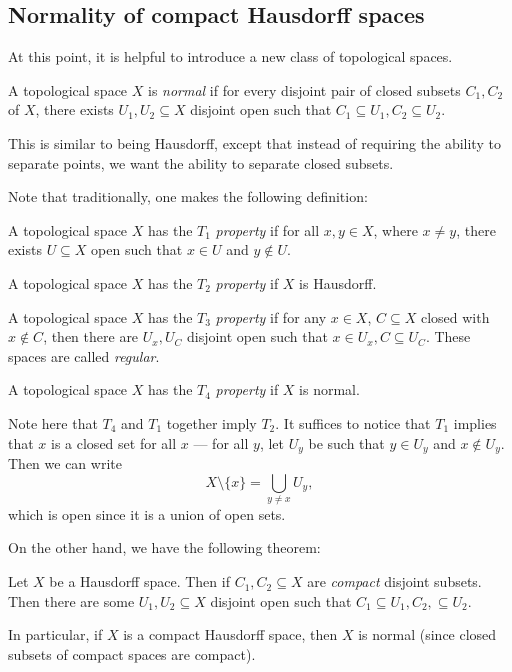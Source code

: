 \documentclass[a4paper]{article}
\begin{document}
\subsection{Normality of compact Hausdorff spaces}
At this point, it is helpful to introduce a new class of topological spaces.
\begin{defi}
  A topological space $X$ is \emph{normal} if for every disjoint pair of closed subsets $C_1, C_2$ of $X$, there exists $U_1, U_2 \subseteq X$ disjoint open such that $C_1 \subseteq U_1, C_2 \subseteq U_2$.
\end{defi}
This is similar to being Hausdorff, except that instead of requiring the ability to separate points, we want the ability to separate closed subsets.

Note that traditionally, one makes the following definition:
\begin{defi}[$T_i$ space]
  A topological space $X$ has the $T_1$ \emph{property} if for all $x, y\in X$, where $x \not= y$, there exists $U\subseteq X$ open such that $x \in U$ and $y\not\in U$.

  A topological space $X$ has the $T_2$ \emph{property} if $X$ is Hausdorff.

  A topological space $X$ has the $T_3$ \emph{property} if for any $x \in X$, $C\subseteq X$ closed with $x \not\in C$, then there are $U_x, U_C$ disjoint open such that $x \in U_x, C\subseteq U_C$.  These spaces are called \emph{regular}.

  A topological space $X$ has the $T_4$ \emph{property} if $X$ is normal.
\end{defi}
Note here that $T_4$ and $T_1$ together imply $T_2$. It suffices to notice that $T_1$ implies that $x$ is a closed set for all $x$ --- for all $y$, let $U_y$ be such that $y \in U_y$ and $x \not\in U_y$. Then we can write
\[
  X\setminus \{x\} = \bigcup_{y \not= x}U_y,
\]
which is open since it is a union of open sets.

On the other hand, we have the following theorem:
\begin{thm}
  Let $X$ be a Hausdorff space. Then if $C_1, C_2 \subseteq X$ are \emph{compact} disjoint subsets. Then there are some $U_1, U_2 \subseteq X$ disjoint open such that $C_1 \subseteq U_1, C_2, \subseteq U_2$.

  In particular, if $X$ is a compact Hausdorff space, then $X$ is normal (since closed subsets of compact spaces are compact).
\end{thm}
\end{document}
